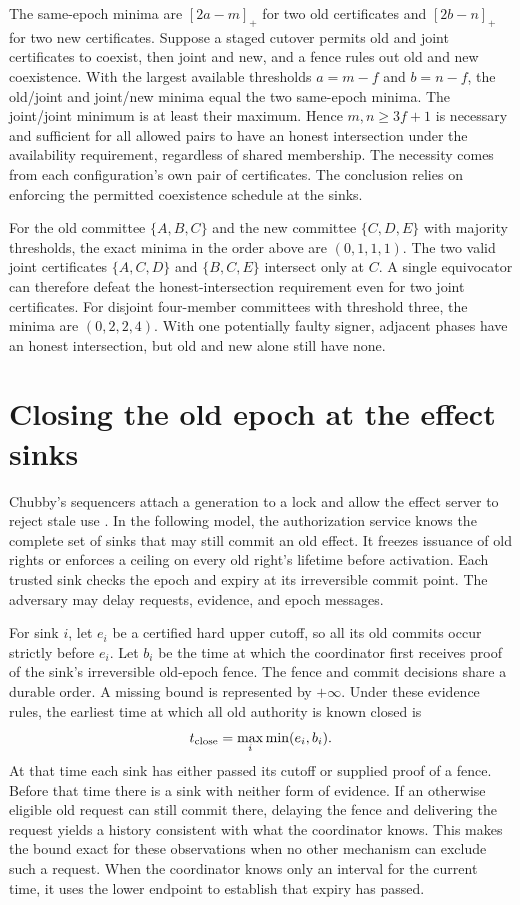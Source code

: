 \documentclass[11pt]{article}
\begin{document}
The same-epoch minima are $[2a-m]_+$ for two old certificates
and $[2b-n]_+$ for two new certificates. Suppose a staged
cutover permits old and joint certificates to coexist, then
joint and new, and a fence rules out old and new coexistence.
With the largest available thresholds $a=m-f$ and $b=n-f$,
the old/joint and joint/new minima equal the two same-epoch
minima. The joint/joint minimum is at least their maximum.
Hence $m,n\ge3f+1$ is necessary and sufficient for all allowed
pairs to have an honest intersection under the availability
requirement, regardless of shared membership. The necessity
comes from each configuration's own pair of certificates.
The conclusion relies on enforcing the permitted coexistence
schedule at the sinks.

For the old committee $\{A,B,C\}$ and the new committee
$\{C,D,E\}$ with majority thresholds, the exact minima
in the order above are $(0,1,1,1)$. The two valid joint
certificates $\{A,C,D\}$ and $\{B,C,E\}$ intersect only
at $C$. A single equivocator can therefore defeat the
honest-intersection requirement even for two joint certificates.
For disjoint four-member committees with threshold three,
the minima are $(0,2,2,4)$. With one potentially faulty
signer, adjacent phases have an honest intersection, but old
and new alone still have none.

\section{Closing the old epoch at the effect sinks}
Chubby's sequencers attach a generation to a lock and allow
the effect server to reject stale use \cite{burrows}. In the
following model, the authorization service knows the complete
set of sinks that may still commit an old effect. It freezes
issuance of old rights or enforces a ceiling on every old
right's lifetime before activation. Each trusted sink checks
the epoch and expiry at its irreversible commit point.
The adversary may delay requests, evidence, and epoch messages.

For sink $i$, let $e_i$ be a certified hard upper cutoff,
so all its old commits occur strictly before $e_i$. Let $b_i$
be the time at which the coordinator first receives proof of
the sink's irreversible old-epoch fence. The fence and commit
decisions share a durable order. A missing bound is represented
by $+\infty$. Under these evidence rules, the earliest time
at which all old authority is known closed is
\[
 t_{\rm close}=\max_i \min(e_i,b_i).
\]
At that time each sink has either passed its cutoff or supplied
proof of a fence. Before that time there is a sink with
neither form of evidence. If an otherwise eligible old request
can still commit there, delaying the fence and delivering the
request yields a history consistent with what the coordinator
knows. This makes the bound exact for these observations when
no other mechanism can exclude such a request. When the
coordinator knows only an interval for the current time, it
uses the lower endpoint to establish that expiry has passed.
\end{document}
